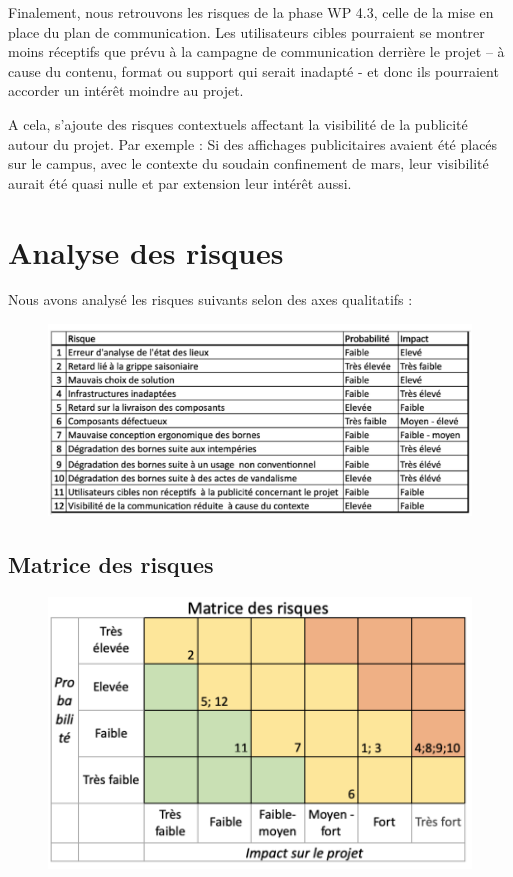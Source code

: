 Finalement, nous retrouvons les risques de la phase  WP 4.3, celle de la mise en place du plan de communication.  
Les utilisateurs cibles pourraient se montrer  moins  réceptifs que prévu à la campagne de communication derrière le projet –  à cause du contenu, format ou support qui serait inadapté - et donc  ils pourraient accorder un intérêt moindre au projet. 

A cela, s’ajoute des risques contextuels affectant la visibilité de la publicité autour du projet. Par exemple : Si des  affichages publicitaires avaient été placés sur le campus, avec le contexte du soudain confinement de mars, leur visibilité aurait été quasi nulle et par  extension leur intérêt aussi. 

\section{Analyse des risques}
Nous avons analysé les risques suivants selon des axes qualitatifs :  
    \begin{figure}[h]
        \centering
        \includegraphics[width=15cm]{Pictures/analyseRisque.png}
    \end{figure}

\subsection{Matrice des risques}
    \begin{figure} [h]
        \centering
        \includegraphics[width=15cm]{Pictures/matriceRisque.png}
    \end{figure}

